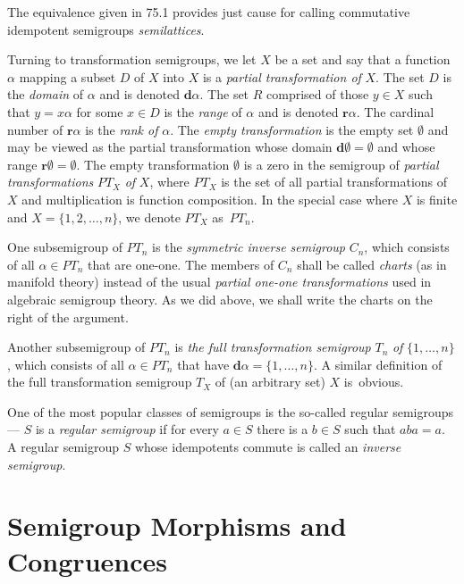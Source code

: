 \documentclass{surv-l}
\numberwithin{equation}{section}
\numberwithin{table}{section}
\numberwithin{figure}{section}
\theoremstyle{definition}
\begin{document}
The equivalence given in 75.1 provides just cause for calling
commutative idempotent semigroups \emph{semilattices}.

Turning to transformation semigroups, we let $X$ be a set and say
that a function $\alpha$ mapping a subset $D$ of $X$ into $X$ is a
\emph{partial transformation of}
$X$. The set $D$ is the \emph{domain} of $\alpha$ and is denoted
$\mathbf{d}\alpha$. The set $R$ comprised of those $y\in X$ such
that $ y=x\alpha$ for some $x\in D$ is the \emph{range} of
$\alpha$ and is denoted $\mathbf{r}\alpha$. The cardinal number of
$\mathbf{r}\alpha$ is the \emph{rank of} $\alpha$. The \emph{empty
transformation} is the empty set
$\emptyset$ and may be viewed as the partial transformation whose
domain $\mathbf{d}\emptyset=\emptyset$ and whose range
$\mathbf{r}\emptyset=\emptyset$. The empty transformation
$\emptyset$ is a zero in the semigroup of \emph{partial transformations}
$PT_{X}$
\emph{of} $X$, where $PT_{X}$ is the set of all partial
transformations of $X$ and multiplication is function composition.
In the special case where $X$ is finite and $X=\{1,2,\ldots, n\}$,
we denote $PT_{X}$ as~$PT_{n}$.

One subsemigroup of $PT_{n}$ is the \emph{symmetric inverse
semigroup} $C_{n}$, which consists
of all $\alpha\in PT_{n}$ that are one-one. The members of $C_{n}$
shall be called \emph{charts} (as in manifold theory) instead of
the usual \emph{partial one-one transformations} used in algebraic
semigroup theory. As we did above, we shall write the charts on
the right of the argument.

Another subsemigroup of $PT_{n}$ is \emph{the full transformation
semigroup} $T_{n}$ \emph{of} $\{1,\ldots, n\}$, which consists of
all $\alpha\in PT_{n}$ that have $\mathbf{d}\alpha=\{1,\ldots,
n\}$. A similar definition of the full transformation semigroup
$T_{X}$ of (an arbitrary set) $X$ is~obvious.

One of the most popular classes of semigroups is the so-called
regular semigroups --- $S$ is a \emph{regular semigroup} if for
every $a \in S$ there is a $b\in S$ such that $aba=a$. A regular
semigroup $S$ whose idempotents commute is called an \emph{inverse
semigroup}.

\section{Semigroup Morphisms and Congruences}\label{secA.76}
\end{document}
